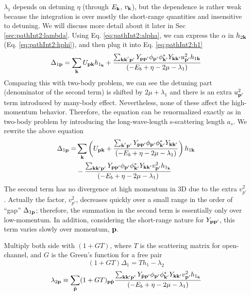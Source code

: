 $\lambda_{1}$ depends on detuning $\eta$ (through $E_{\mathbf{k}}$, $v_{\mathbf{k}}$), but the dependence is rather weak because the integration is over mostly the short-range quantities and  insensitive to detuning. We will discuss more detail about it later in Sec \ref{sec:pathInt2:lambda}. 
Using Eq. \ref{eq:pathInt2:alpha}, we can express the $\alpha$ in $h_{2\mathbf{k}}$ (Eq. \ref{eq:pathInt2:hphi}), and then plug it into Eq. \ref{eq:pathInt2:h1}
\begin{equation*}
\Delta_{1\mathbf{p}}=\sum_{\mathbf{k}}{}U_{\mathbf{p}\mathbf{k}}{h_{1_{\mathbf{k}}}}+
	\frac{\sum_{\mathbf{k}\mathbf{k}^{'}\mathbf{p}'} Y_{\mathbf{p}\mathbf{p}'}{\phi_{\mathbf{p}'}}{\phi_{\mathbf{k}'}^{*}}{Y_{\mathbf{k}\mathbf{k}'}}u_{\mathbf{p}'}^{2}{{h_{1\mathbf{k}}}}}
		{\left(-E_{b}+\eta-2\mu-\lambda_{1}\right)}
\end{equation*}
Comparing this with two-body problem, we can see the detuning part (denominator of the second term) is shifted by $2\mu+\lambda_{1}$ and there is an extra $u_{\mathbf{p}'}^{2}$ term introduced by many-body effect.  Nevertheless, none of these affect the high-momentum behavior. Therefore, the equation can be renormalized exactly as in two-body problem by introducing the long-wave-length s-scattering length $a_{s}$.  We rewrite the above equation
\begin{equation*}
\begin{split}
\Delta_{1\mathbf{p}}=&\sum_{\mathbf{k}}\left(U_{\mathbf{p}\mathbf{k}}+
	\frac{\sum_{\mathbf{k}^{'}\mathbf{p}'} Y_{\mathbf{p}\mathbf{p}'}{\phi_{\mathbf{p}'}}{\phi_{\mathbf{k}'}^{*}}{Y_{\mathbf{k}\mathbf{k}'}}}
		{\left(-E_{b}+\eta-2\mu-\lambda_{1}\right)}\right){{h_{1\mathbf{k}}}}\\
	&-\frac{\sum_{\mathbf{k}\mathbf{k}{'}\mathbf{p}'} Y_{\mathbf{p}\mathbf{p}'}{\phi_{\mathbf{p}'}}{\phi_{\mathbf{k}'}^{*}}{Y_{\mathbf{k}\mathbf{k}'}}v_{\mathbf{p}'}^{2}{h_{1_{\mathbf{k}}}}}
		{\left(-E_{b}+\eta-2\mu-\lambda_{1}\right)}{}
\end{split}
\end{equation*}
The second term has no divergence at high momentum in 3D due to the extra $v_{p'}^{2}$. Actually the factor, $v_{p'}^{2}$, decreases quickly over a small range in the order of  ``gap'' $\Delta_{1\mathbf{p}}$; therefore, the summation in the second term is essentially only over low-momentum.   In addition, considering the short-range nature for $Y_{\mathbf{p}\mathbf{p}'}$, this term varies slowly over momentum, $\mathbf{p}$.  

Multiply both side with $(1+GT)$,  where $T$ is the scattering matrix for open-channel, and $G$ is the Green's function for a free pair
\begin{equation*}
(1+GT)\Delta_{1}=Th_{1}-\lambda_{2}
\end{equation*}
\begin{equation}\label{eq:pathInt2:lambda2}
\lambda_{2\mathbf{p}}\equiv\sum_{\tilde{\mathbf{p}}}(1+GT)_{\mathbf{p}\tilde{\mathbf{p}}}\frac{\sum_{\mathbf{k}\mathbf{k}{'}\mathbf{p}'} Y_{\tilde{\mathbf{p}}\mathbf{p}'}{\phi_{\mathbf{p}'}}{\phi_{\mathbf{k}'}^{*}}{Y_{\mathbf{k}\mathbf{k}'}}v_{\mathbf{p}'}^{2}{h_{1_{\mathbf{k}}}}}
		{\left(-E_{b}+\eta-2\mu-\lambda_{1}\right)}{}
\end{equation}

